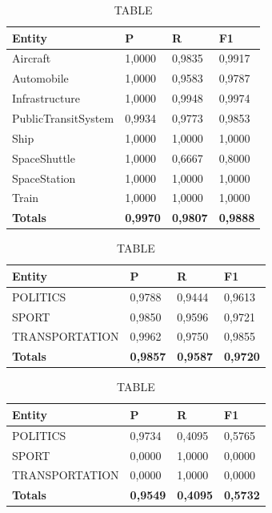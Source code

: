 \documentclass[thesis=M,english]{FITthesis}[2018/05/30]
\begin{document}
	
	\begin{table}[H]\centering
		\caption{TABLE}
		\label{}
		\begin{tabular}{|l|l|l|l|}
			\hline {\textbf{Entity}} & {\textbf{P}} & {\textbf{R}} & {\textbf{F1}}\\\hline
				Aircraft & 1,0000 & 0,9835 & 0,9917\\
				Automobile & 1,0000 & 0,9583 & 0,9787\\				
				Infrastructure & 1,0000 & 0,9948 & 0,9974\\
				PublicTransitSystem & 0,9934 & 0,9773 & 0,9853\\
				Ship & 1,0000 & 1,0000 & 1,0000\\				
				SpaceShuttle & 1,0000 & 0,6667 & 0,8000\\
				SpaceStation & 1,0000 & 1,0000 & 1,0000\\
				Train & 1,0000 & 1,0000 & 1,0000\\\hline
				\textbf{Totals} & \textbf{0,9970} & \textbf{0,9807} & \textbf{0,9888}\\\hline
		\end{tabular}
	\end{table}	




	\begin{table}[H]\centering
		\caption{TABLE}
		\label{}
		\begin{tabular}{|l|l|l|l|}
			\hline {\textbf{Entity}} & {\textbf{P}} & {\textbf{R}} & {\textbf{F1}}\\\hline
				POLITICS & 0,9788 & 0,9444 & 0,9613\\
				SPORT & 0,9850 & 0,9596 & 0,9721\\
				TRANSPORTATION & 0,9962 & 0,9750 & 0,9855\\\hline
				\textbf{Totals} & \textbf{0,9857} & \textbf{0,9587} & \textbf{0,9720}\\\hline
		\end{tabular}
	\end{table}

	\begin{table}[H]\centering
		\caption{TABLE}
		\label{}
		\begin{tabular}{|l|l|l|l|}
			\hline {\textbf{Entity}} & {\textbf{P}} & {\textbf{R}} & {\textbf{F1}}\\\hline
				POLITICS & 0,9734 & 0,4095 & 0,5765\\
				SPORT & 0,0000 & 1,0000 & 0,0000\\
				TRANSPORTATION & 0,0000 & 1,0000 & 0,0000\\\hline
				\textbf{Totals} & \textbf{0,9549} & \textbf{0,4095} & \textbf{0,5732}\\\hline
		\end{tabular}
	\end{table}
\end{document}
